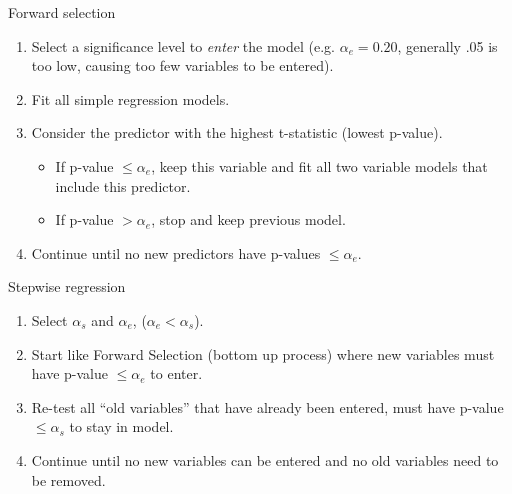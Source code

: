 \documentclass{beamer}
\begin{document}
\begin{frame}{Forward selection}
\begin{enumerate}
    \item Select a significance level to \textit{enter} the model (e.g. $\alpha_e = 0.20$, generally .05 is too low, causing too few variables to be entered).
\item\pause Fit all simple regression models.
\item\pause Consider the predictor with the highest t-statistic (lowest p-value).
\begin{itemize}
    \item\pause If p-value $\le\alpha_e$, keep this variable and fit all two variable models
that include this predictor.
    \item\pause If p-value $>\alpha_e$, stop and keep previous model.
\end{itemize}
\item\pause Continue until no new predictors have p-values $\le\alpha_e$.    
\end{enumerate}
\end{frame}

\begin{frame}{Stepwise regression}
\begin{enumerate}
\item Select $\alpha_s$ and $\alpha_e$, ($\alpha_e < \alpha_s$).
\item\pause  Start like Forward Selection (bottom up process) where new variables
must have p-value $\le\alpha_e$ to enter.
\item\pause Re-test all ``old variables'' that have already been entered, must have
p-value $\le\alpha_s$ to stay in model.
\item\pause Continue until no new variables can be entered and no old variables
need to be removed.
\end{enumerate}
\end{frame}
\end{document}

